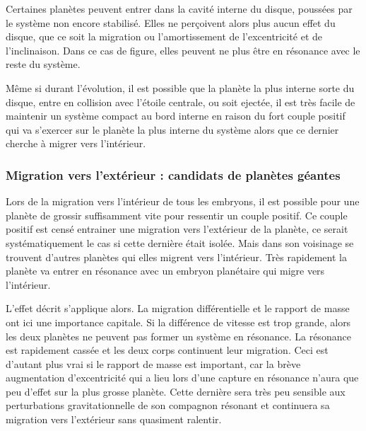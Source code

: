 \bigskip

Certaines planètes peuvent entrer dans la cavité interne du disque, poussées par le système non encore stabilisé. Elles ne perçoivent alors plus aucun effet du disque, que ce soit la migration ou l'amortissement de l'excentricité et de l'inclinaison. Dans ce cas de figure, elles peuvent ne plus être en résonance avec le reste du système. 

Même si durant l'évolution, il est possible que la planète la plus interne sorte du disque, entre en collision avec l'étoile centrale, ou soit ejectée, il est très facile de maintenir un système compact au bord interne en raison du fort couple positif qui va s'exercer sur le planète la plus interne du système alors que ce dernier cherche à migrer vers l'intérieur.

\subsubsection{Migration vers l'extérieur : candidats de planètes géantes}\label{sec:outward-case}
Lors de la migration vers l'intérieur de tous les embryons, il est possible pour une planète de grossir suffisamment vite pour ressentir un couple positif. Ce couple positif est censé entrainer une migration vers l'extérieur de la planète, ce serait systématiquement le cas si cette dernière était isolée. Mais dans son voisinage se trouvent d'autres planètes qui elles migrent vers l'intérieur. Très rapidement la planète va entrer en résonance avec un embryon planétaire qui migre vers l'intérieur.

L'effet décrit  s'applique alors. La migration différentielle et le rapport de masse ont ici une importance capitale. Si la différence de vitesse est trop grande, alors les deux planètes ne peuvent pas former un système en résonance. La résonance est rapidement cassée et les deux corps continuent leur migration. Ceci est d'autant plus vrai si le rapport de masse est important, car la brève augmentation d'excentricité qui a lieu lors d'une capture en résonance n'aura que peu d'effet sur la plus grosse planète. Cette dernière sera très peu sensible aux perturbations gravitationnelle de son compagnon résonant et continuera sa migration vers l'extérieur sans quasiment ralentir. 

